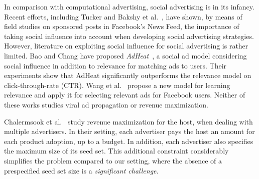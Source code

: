 In comparison with computational advertising, social advertising is in its infancy. Recent efforts, including Tucker \cite{tucker12} and Bakshy et al.~\cite{bakshy12}, have shown, by means of field studies on sponsored posts in Facebook's News Feed,
the importance of taking social influence into account when developing social advertising strategies.
However, literature on exploiting social influence for social advertising is rather limited.
Bao and Chang have proposed \emph{AdHeat}~\cite{AdHeat}, a social ad model considering social influence
 in addition to relevance for matching ads to users.
Their experiments %
show that AdHeat significantly outperforms the relevance model on click-through-rate (CTR). Wang et al.~\cite{wang2011learning} propose a new model for learning relevance and apply it for selecting relevant ads for Facebook users.
Neither of these works studies viral ad propagation or revenue maximization.


Chalermsook et al.~\cite{chalermsook} study revenue maximization for the host, when dealing with multiple advertisers. In their setting, each advertiser %
pays the host an amount %
for each product adoption, up to a %
budget.
In addition, each advertiser also specifies the maximum size %
of its seed set. This additional constraint considerably simplifies the problem compared to our setting, where the absence of a prespecified seed set size is a \emph{significant challenge}.

